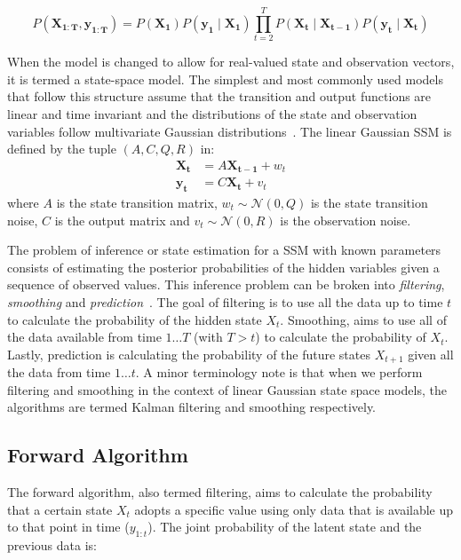 \begin{equation}\label{eq:joint_prob_ssm}
  P(\mathbf{X_{1:T}}, \mathbf{y_{1:T}}) = P(\mathbf{X_1})P(\mathbf{y_1} \mid \mathbf{X_1}) \prod\limits_{t=2}^{T} P(\mathbf{X_t} \mid \mathbf{X_{t-1}} ) P( \mathbf{y_t} \mid \mathbf{X_{t}} )
\end{equation}

When the model is changed to allow for real-valued state and observation vectors, it is termed a state-space model. The simplest and most commonly used models that follow this structure assume that the transition and output functions are linear and time invariant and the distributions of the state and observation variables follow multivariate Gaussian distributions~\citep{ghahramani2000variational}. The linear Gaussian SSM is defined by the tuple $(A, C, Q, R)$ in:
\begin{equation}\label{eq:hmm_first_order}
  \begin{split}
      \mathbf{X_t} &= A\mathbf{X_{t-1}} + w_t \\
      \mathbf{y_t} &= C\mathbf{X_t} + v_t
  \end{split}
\end{equation}
where $A$ is the state transition matrix, $w_t \sim \mathcal{N}(0,Q)$ is the state transition noise, $C$ is the output matrix and $v_t \sim \mathcal{N}(0,R)$ is the observation noise.

The problem of inference or state estimation for a SSM with known parameters consists of estimating the posterior probabilities of the hidden variables given a sequence of observed values. This inference problem can be broken into \textit{filtering}, \textit{smoothing} and \textit{prediction}~\citep{shumway2000time}. The goal of filtering is to use all the data up to time $t$ to calculate the probability of the hidden state $X_t$. Smoothing, aims to use all of the data available from time $1 \hdots T$ (with $T > t$) to calculate the probability of $X_t$. Lastly, prediction is calculating the probability of the future states $X_{t+1}$ given all the data from time $1 \hdots t$. A minor terminology note is that when we perform filtering and smoothing in the context of linear Gaussian state space models, the algorithms are termed Kalman filtering and smoothing respectively.

\subsection{Forward Algorithm}
The forward algorithm, also termed filtering, aims to calculate the probability that a certain state $X_t$ adopts a specific value using only data that is available up to that point in time ($y_{1:t}$). The joint probability of the latent state and the previous data is:

